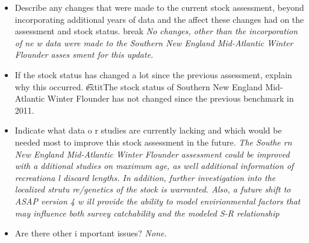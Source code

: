 {\begin{itemize}{}
{tions for Southern New England Mid-Atlantic Winter Flounder are reasonably well
 determined. There is uncertainty in the estimates of M. In addition, while the
 retrospective pattern is considered minor (within the 90\% CI of both F and SS
B) the rho adjusted terminal value is very close to falling out of the bounds, 
becoming a major retrospective pattern. This would lead to retrospective adjust
ments being needed for the projections.} \item{}Describe any changes that were 
made to the current stock assessment, beyond incorporating additional years of 
data and the affect these changes had on the assessment and stock status. \line
break{} \hspace*{0.5cm} \textit{ No changes, other than the incorporation of ne
w data were made to the Southern New England Mid-Atlantic Winter Flounder asses
sment for this update.} \item{}If the stock status has changed a lot since the 
previous assessment, explain why this occurred. \linebreak{} \hspace*{0.5cm} \t
extit{The stock status of Southern New England Mid-Atlantic Winter Flounder has
 not changed since the previous benchmark in 2011.} \item{}Indicate what data o
r studies are currently lacking and which would be needed most to improve this 
stock assessment in the future. \linebreak{} \hspace*{0.5cm} \textit{The Southe
rn New England Mid-Atlantic Winter Flounder assessment could be improved with a
dditional studies on maximum age, as well additional information of recreationa
l discard lengths. In addition, further investigation into the localized strutu
re/genetics of the stock is warranted. Also, a future shift to ASAP version 4 w
ill provide the ability to model envirionmental factors that may influence both
 survey catchability and the modeled S-R relationship} \item{}Are there other i
mportant issues? \linebreak{} \hspace*{0.5cm} \textit{None. } \end{itemize}{}} 
